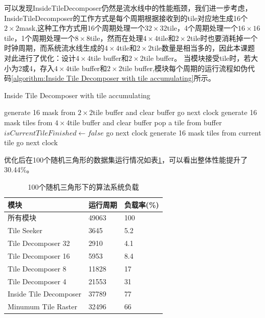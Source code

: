 可以发现InsideTileDecomposer仍然是流水线中的性能瓶颈，我们进一步考虑，InsideTileDecomposer的工作方式是每个周期根据接收到的tile对应地生成16个$2\times 2$mask,这种工作方式用16个周期处理一个$32\times 32$tile，4个周期处理一个$16\times 16$tile，1个周期处理一个$8\times 8$tile，然而在处理$4\times 4$tile和$2\times 2$tile时也要消耗掉一个时钟周期，而系统流水线生成的$4\times 4$tile和$2\times 2$tile数量是相当多的，因此本课题对此进行了优化：设计$4\times 4$tile buffer和$2\times 2$tile buffer。
当模块接受tile时，若大小为2或4，存入$4\times 4$tile buffer和$2\times 2$tile buffer,模块每个周期的运行流程如伪代码\ref{algorithm:Inside Tile Decomposer with tile accumulating}所示。

\begin{algorithm} 
	\caption{Inside Tile Decomposer with tile accumulating} 
	\label{algorithm:Inside Tile Decomposer with tile accumulating} 
	\begin{algorithmic}
            \STATE generate 16 mask from $2\times 2$tile buffer and clear buffer
            \STATE go next clock
            \STATE generate 16 mask tiles from $4\times 4$tile buffer and clear buffer
        \ELSE
                \STATE pop a tile from buffer 
                \STATE $isCurrentTileFinished \gets false$
            \ELSE 
                \STATE go next clock
            \ENDIF
        \ENDIF
    \ELSE 
        \STATE generate 16 mask tiles from current tile
        \STATE go next clock
    \ENDIF
	\end{algorithmic} 
\end{algorithm}

优化后在100个随机三角形的数据集运行情况如表\ref{tab:100 random triangles with improved inside decomposer}，可以看出整体性能提升了30.44\%。
\begin{table}[ht]
    \caption{\label{tab:100 random triangles with improved inside decomposer}100个随机三角形下的算法系统负载}
    \begin{tabularx}{\linewidth}{|XXX|}
        \hline
        模块 & 运行周期 & 负载率(\%) \\ \hline
        所有模块 & 49063 & 100 \\ \hline
        Tile Seeker & 3645 & 5.2  \\ \hline
        Tile Decomposer 32 & 2910 & 4.1  \\ \hline
        Tile Decomposer 16 & 5953 & 8.4  \\ \hline
        Tile Decomposer 8 & 11828 & 17  \\ \hline
        Tile Decomposer 4 & 21553 & 31  \\ \hline
        Inside Tile Decomposer & 37789 & 77 \\ \hline
        Minumum Tile Raster & 32496 & 66 \\ \hline
    \end{tabularx}
\end{table}

